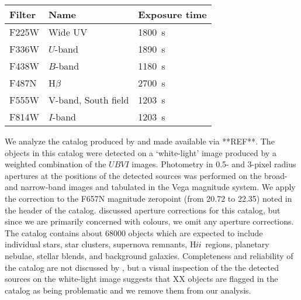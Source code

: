 \begin{table}
\centering
\caption{
\label{tab:filters}}
\begin{tabular}{lll}
\hline\hline
Filter & Name & Exposure time\\
\hline
F225W &  Wide UV & 1800~s\\
F336W &  $U$-band & 1890~s\\ 
F438W &  $B$-band & 1180~s\\
F487N &  H$\beta$ & 2700~s\\
F555W &  V-band, South field & 1203~s\\
F814W &  $I$-band & 1203~s\\
\hline
\end{tabular}
\end{table}

We analyze the catalog produced by \citet{chandar10} and made available via **REF**.
The objects in this catalog were detected on a `white-light' image produced by a weighted combination of the $UBVI$ images.
Photometry in 0.5- and 3-pixel radius apertures at the positions of the detected sources was performed on the broad- and narrow-band images and tabulated in the Vega magnitude system. %
We apply the correction to the F657N magnitude zeropoint (from 20.72 to 22.35) noted in the header of the catalog.
\citet{chandar10} discussed aperture corrections for this catalog, but since we are primarily concerned with colours,
we omit any aperture corrections. %
The catalog contains about 68000 objects which are expected to include individual stars, star clusters,
supernova remnants, H${\sc ii}$ regions, planetary nebulae, %
stellar blends, and background galaxies. %
Completeness and reliability of the catalog are not discussed by \citet{chandar10},
but a visual inspection of the the detected sources on the white-light image suggests that %
XX objects are flagged in the catalog as being problematic %
and we remove them from our analysis.

